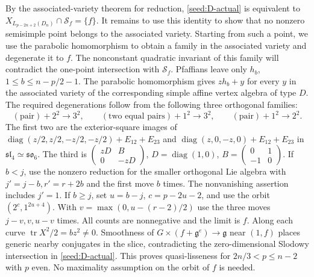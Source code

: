 \documentclass[11pt,a4paper]{amsart}
\numberwithin{equation}{section}
\theoremstyle{definition}
\theoremstyle{remark}
\newcommand{\g}{\mathfrak g}
\newcommand{\sog}{\mathfrak{so}}
\newcommand{\slg}{\mathfrak{sl}}
\newcommand{\tr}{\operatorname{tr}}
\begin{document}
By the associated-variety theorem for reduction,
\eqref{seed:D-actual} is equivalent to
$X_{L_{p-2n+2}(D_n)}\cap\mathcal S_f=\{f\}$.
It remains to use this identity to show that no nonzero semisimple
point belongs to the associated variety. Starting from such a point,
we use the parabolic homomorphism to obtain a family in the associated
variety and degenerate it to $f$. The nonconstant quadratic invariant
of this family will contradict the one-point intersection with
$\mathcal S_f$.
Pfaffians leave only $h_b$, $1\le b\le n-p/2-1$. The parabolic homomorphism gives
$zh_b+y$ for every $y$ in the associated variety of the corresponding
simple affine vertex algebra of type $D$. The required degenerations
follow from the following three orthogonal families:
$$
 (\text{pair})+2^2\to3^2,\qquad
 (\text{two equal pairs})+1^2\to3^2,\qquad
 (\text{pair})+1^2\to2^2.
$$
The first two are the exterior-square images of
$\operatorname{diag}(z/2,z/2,-z/2,-z/2)+E_{12}+E_{23}$ and
$\operatorname{diag}(z,0,-z,0)+E_{12}+E_{23}$ in $\slg_4\simeq\sog_6$.
The third is $\left(\begin{smallmatrix}zD&B\\0&-zD\end{smallmatrix}\right)$,
$D=\operatorname{diag}(1,0)$, $B=\left(\begin{smallmatrix}0&1\\-1&0\end{smallmatrix}\right)$.
If $b<j$, use the nonzero reduction for the smaller orthogonal Lie algebra with $j'=j-b,r'=r+2b$ and the first
move $b$ times. The nonvanishing assertion includes $j'=1$. If $b\ge j$, set $u=b-j$,
$c=p-2u-2$, and use the orbit $(2^c,1^{2u+4})$.
With $v=\max(0,u-(r-2)/2)$ use the three moves $j-v,v,u-v$ times.
All counts are nonnegative and the limit is $f$. Along each curve
$\tr X^2/2=bz^2\ne0$. Smoothness of $G\times(f+\g^e)\to\g$
near $(1,f)$ places generic nearby conjugates in the slice, contradicting
the zero-dimensional Slodowy intersection in \eqref{seed:D-actual}.
This proves quasi-lisseness for $2n/3<p\le n-2$ with $p$ even.
No maximality assumption on the orbit of $f$ is needed.
\end{document}
